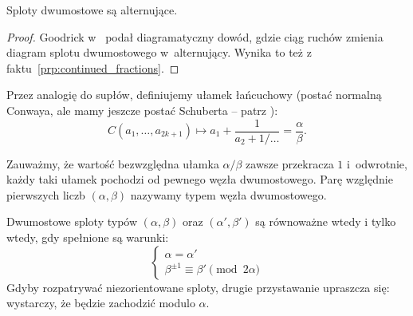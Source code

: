 
\begin{proposition}
    Sploty dwumostowe są alternujące.
\end{proposition}

\begin{proof}
    Goodrick w~\cite{goodrick1972} podał diagramatyczny dowód, gdzie ciąg ruchów zmienia diagram splotu dwumostowego w~alternujący.
    Wynika to też z faktu~\ref{prp:continued_fractions}.
\end{proof}

%
%
%
Przez analogię do supłów, definiujemy ułamek łańcuchowy (postać normalną Conwaya, ale mamy jeszcze postać Schuberta -- patrz \cite[s. 21]{kawauchi1996}):
\begin{equation}
    C(a_1, \ldots, a_{2k+1}) \mapsto a_1 + \frac{1}{a_2 + 1/\ldots} = \frac \alpha \beta.
\end{equation}

Zauważmy, że wartość bezwzględna ułamka $\alpha/\beta$ zawsze przekracza $1$ i~odwrotnie, każdy taki ułamek pochodzi od pewnego węzła dwumostowego.
Parę względnie pierwszych liczb $(\alpha, \beta)$ nazywamy typem węzła dwumostowego.

\begin{proposition}
    \label{prp:tangle_equivalence}
    Dwumostowe sploty typów $(\alpha, \beta)$ oraz $(\alpha', \beta')$ są równoważne wtedy i tylko wtedy, gdy spełnione są warunki:
    \begin{equation}
        \begin{cases}
            \alpha = \alpha' \\
            \beta^{\pm 1} \equiv \beta' \pmod {2 \alpha}
        \end{cases}
    \end{equation}
    Gdyby rozpatrywać niezorientowane sploty, drugie przystawanie upraszcza się: wystarczy, że będzie zachodzić modulo $\alpha$.
\end{proposition}

